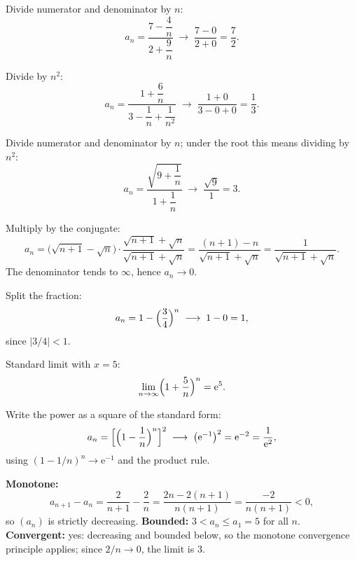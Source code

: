 \begin{solutions}
  \item Divide numerator and denominator by $n$:
        \[
          a_{n}=\frac{7-\dfrac{4}{n}}{2+\dfrac{9}{n}}
          \;\longrightarrow\;\frac{7-0}{2+0}=\frac{7}{2} .
        \]

  \item Divide by $n^{2}$:
        \[
          a_{n}=\frac{1+\dfrac{6}{n}}{3-\dfrac{1}{n}+\dfrac{1}{n^{2}}}
          \;\longrightarrow\;\frac{1+0}{3-0+0}=\frac{1}{3} .
        \]

  \item Divide numerator and denominator by $n$; under the root this means
        dividing by $n^{2}$:
        \[
          a_{n}=\frac{\sqrt{9+\dfrac{1}{n}}}{1+\dfrac{1}{n}}
          \;\longrightarrow\;\frac{\sqrt{9}}{1}=3 .
        \]

  \item Multiply by the conjugate:
        \[
          a_{n}=\bigl(\sqrt{n+1}-\sqrt{n}\bigr)
                \cdot\frac{\sqrt{n+1}+\sqrt{n}}{\sqrt{n+1}+\sqrt{n}}
               =\frac{(n+1)-n}{\sqrt{n+1}+\sqrt{n}}
               =\frac{1}{\sqrt{n+1}+\sqrt{n}} .
        \]
        The denominator tends to $\infty$, hence $a_{n}\to 0$.

  \item Split the fraction:
        \[
          a_{n}=1-\Bigl(\frac{3}{4}\Bigr)^{n}
          \;\longrightarrow\;1-0=1 ,
        \]
        since $|3/4|<1$.

  \item Standard limit with $x=5$:
        \[
          \lim_{n\to\infty}\Bigl(1+\frac{5}{n}\Bigr)^{n}=\mathrm{e}^{5} .
        \]

  \item Write the power as a square of the standard form:
        \[
          a_{n}=\Bigl[\Bigl(1-\frac{1}{n}\Bigr)^{n}\Bigr]^{2}
          \;\longrightarrow\;\bigl(\mathrm{e}^{-1}\bigr)^{2}
          =\mathrm{e}^{-2}=\frac{1}{\mathrm{e}^{2}} ,
        \]
        using $(1-1/n)^{n}\to\mathrm{e}^{-1}$ and the product rule.

  \item \textbf{Monotone:}
        \[
          a_{n+1}-a_{n}=\frac{2}{n+1}-\frac{2}{n}
          =\frac{2n-2(n+1)}{n(n+1)}=\frac{-2}{n(n+1)}<0 ,
        \]
        so $(a_{n})$ is strictly decreasing.
        \textbf{Bounded:} $3<a_{n}\leq a_{1}=5$ for all $n$.
        \textbf{Convergent:} yes: decreasing and bounded below, so the
        monotone convergence principle applies; since $2/n\to 0$, the
        limit is $3$.


\end{solutions}
